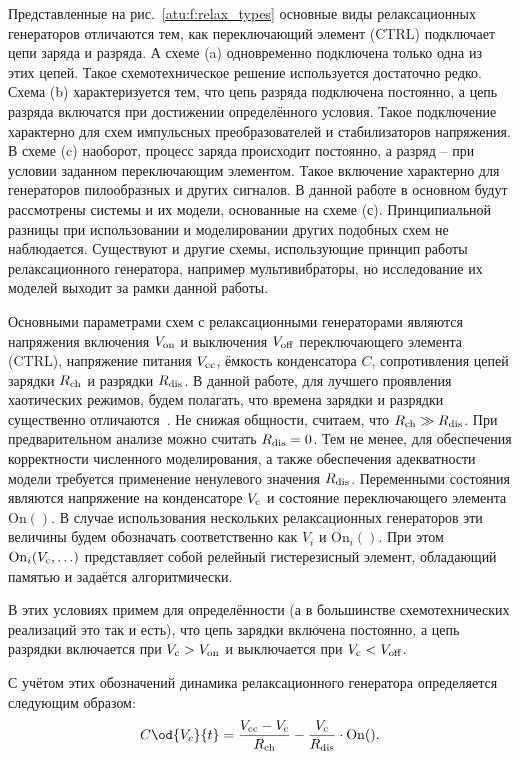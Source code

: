 Представленные на рис.~\ref{atu:f:relax_types}
основные виды релаксационных генераторов отличаются
тем, как переключающий элемент (CTRL)
подключает цепи заряда и разряда. А схеме (a)
одновременно подключена только одна из этих цепей.
Такое схемотехническое решение используется достаточно редко.
Схема (b) характеризуется тем, что цепь разряда
подключена постоянно, а цепь разряда
включатся при достижении определённого условия. Такое подключение
характерно для схем импульсных преобразователей и стабилизаторов
напряжения. В схеме (c) наоборот, процесс заряда происходит постоянно,
а разряд -- при условии заданном переключающим элементом. Такое
включение характерно для генераторов пилообразных и других сигналов.
В данной работе в основном будут рассмотрены системы и их модели,
основанные на схеме (с). Принципиальной разницы при использовании
и моделировании других подобных схем не наблюдается.
Существуют и другие схемы, использующие принцип работы
релаксационного генератора, например мультивибраторы,
но исследование их моделей выходит за рамки данной работы.


Основными параметрами схем с релаксационными генераторами являются
напряжения включения $V_\mathrm{on}$ и выключения $V_\mathrm{off}$
переключающего элемента (CTRL),
напряжение питания $V_\mathrm{cc}$,
ёмкость конденсатора $C$,
сопротивления цепей зарядки $R_\mathrm{ch}$
и разрядки $R_\mathrm{dis}$.
В данной работе, для лучшего проявления
хаотических режимов,
будем полагать, что времена зарядки и разрядки существенно отличаются~\cite{atu_asau19}.
Не снижая общности, считаем, что $R_\mathrm{ch} \gg R_\mathrm{dis} $.
При предварительном анализе можно считать $R_\mathrm{dis} = 0$.
Тем не менее, для обеспечения корректности численного моделирования,
а также обеспечения адекватности модели требуется применение ненулевого значения $R_\mathrm{dis}$.
Переменными состояния являются напряжение на конденсаторе $V_\mathrm{c}$
и состояние переключающего элемента $\mathrm{On}()$.
В случае использования нескольких релаксационных генераторов
эти величины будем обозначать соответственно как
$V_{i}$ и $ \mathrm{On}_{i}()$.
При этом  $ \mathrm{On}_{i}( V_\mathrm{c}, \ldots )$ представляет собой
релейный гистерезисный элемент, обладающий памятью и задаётся алгоритмически.

В этих условиях примем для определённости
(а в большинстве схемотехнических реализаций это так и есть),
что цепь зарядки включена постоянно, а цепь разрядки
включается при $V_\mathrm{c} > V_\mathrm{on} $ и выключается при
$V_\mathrm{c} < V_\mathrm{off}$.

С учётом этих обозначений динамика релаксационного генератора
определяется следующим образом:
%
\begin{equation}
  C \od{V_c}{t}
  =
  \frac{V\Tidx{cc} - V\Tidx{c}}{R\Tidx{ch}}
  - \frac{V\Tidx{c}}{R\Tidx{dis}} \cdot \mathrm{On}().
  \label{atu:eq:relax0}
\end{equation}

